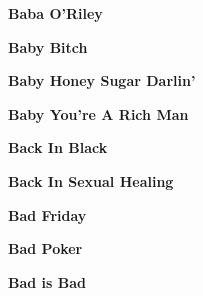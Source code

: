 \newline
\vspace{10pt} 
\begin{center}\textbf{Baba O'Riley}\end{center}
\newline
\vspace{10pt} 
\begin{center}\textbf{Baby Bitch}\end{center}
\newline
\vspace{10pt} 
\begin{center}\textbf{Baby Honey Sugar Darlin'}\end{center}
\newline
\vspace{10pt} 
\begin{center}\textbf{Baby You're A Rich Man}\end{center}
\newline
\vspace{10pt} 
\begin{center}\textbf{Back In Black}\end{center}
\newline
\vspace{10pt} 
\begin{center}\textbf{Back In Sexual Healing}\end{center}
\newline
\vspace{10pt} 
\begin{center}\textbf{Bad Friday}\end{center}
\newline
\vspace{10pt} 
\begin{center}\textbf{Bad Poker}\end{center}
\newline
\vspace{10pt} 
\begin{center}\textbf{Bad is Bad}\end{center}
\newline
\vspace{10pt} 
